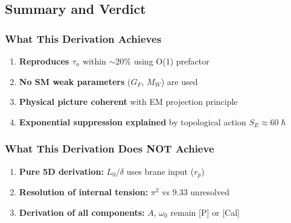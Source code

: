 \documentclass[11pt,a4paper]{article}
\newcommand{\hbar}{\hslash}
\begin{document}
\subsection{Summary and Verdict}

\subsubsection{What This Derivation Achieves}

\begin{enumerate}
\item \textbf{Reproduces $\tau_n$} within $\sim$20\% using O(1) prefactor
\item \textbf{No SM weak parameters} ($G_F$, $M_W$) are used
\item \textbf{Physical picture coherent} with EM projection principle
\item \textbf{Exponential suppression explained} by topological action $S_E \approx 60\hbar$
\end{enumerate}

\subsubsection{What This Derivation Does NOT Achieve}

\begin{enumerate}
\item \textbf{Pure 5D derivation:} $L_0/\delta$ uses brane input ($r_p$)
\item \textbf{Resolution of internal tension:} $\pi^2$ vs 9.33 unresolved
\item \textbf{Derivation of all components:} $A$, $\omega_0$ remain [P] or [Cal]
\end{enumerate}
\end{document}

